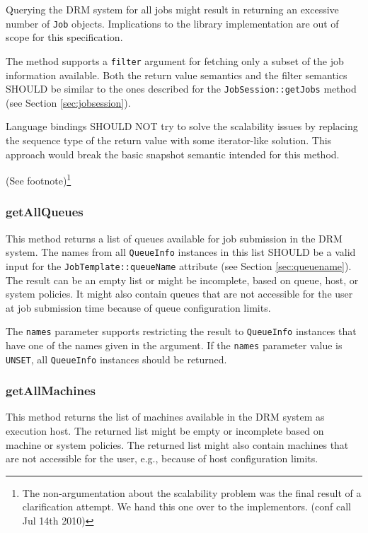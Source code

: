 \documentclass{article}
\newcommand{\h}[1]{\lstinline|#1|}
\newcommand{\langbind}[1]{\begin{shaded}#1\end{shaded}}
\newcommand{\rat}[1]{ {\tiny(See footnote)}\footnote{#1} }
\begin{document}
Querying the DRM system for all jobs might result in returning an excessive number of \h{Job} objects. Implications to the library implementation are out of scope for this specification. 

The method supports a \h{filter} argument for fetching only a subset of the job information available. Both the return value semantics and the filter semantics SHOULD be similar to the ones described for the \h{JobSession::getJobs} method (see Section \ref{sec:jobsession}). 

\langbind{
Language bindings SHOULD NOT try to solve the scalability issues by replacing the sequence type of the return value with some iterator-like solution. This approach would break the basic snapshot semantic intended for this method.
}

\rat{
The non-argumentation about the scalability problem was the final result of a clarification attempt. We hand this one over to the implementors. (conf call Jul 14th 2010)
}

\subsubsection{getAllQueues}

This method returns a list of queues available for job submission in the DRM system. The names from all \h{QueueInfo} instances in this list SHOULD be a valid input for the \h{JobTemplate::queueName} attribute (see Section \ref{sec:queuename}). The result can be an empty list or might be incomplete, based on queue, host, or system policies. It might also contain queues that are not accessible for the user at job submission time because of queue configuration limits.

The \h{names} parameter supports restricting the result to \h{QueueInfo} instances that have one of the names given in the argument. If the \h{names} parameter value is \h{UNSET}, all \h{QueueInfo} instances should be returned.

\subsubsection{getAllMachines}

This method returns the list of machines available in the DRM system as execution host. The returned list might be empty or incomplete based on machine or system policies. The returned list might also contain machines that are not accessible for the user, e.g., because of host configuration limits.
\end{document}
